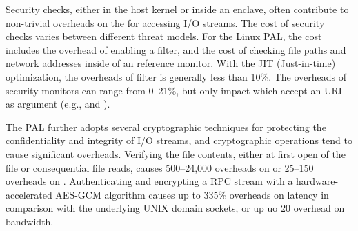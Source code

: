 Security checks, either in the host kernel or inside an enclave,
often contribute to
non-trivial overheads on the \hostapis{} for accessing I/O streams.
The cost of security checks
varies between different threat models.
For the Linux PAL, the cost includes the overhead of enabling a \seccomp{} filter, and the cost of checking file paths and network addresses
inside of an reference monitor.
With the JIT (Just-in-time) optimization,
the overheads of \seccomp{} filter is generally less than 10\%.
The overheads of security monitors can range from 0--21\%, but only impact \hostapis{} which accept an URI as argument (e.g.,  and ).

 
The \sgx{} PAL further adopts several cryptographic techniques
for protecting the confidentiality and integrity of I/O streams, and cryptographic operations tend to cause significant overheads.
Verifying the file contents, either at first open of the file or consequential file reads,
causes 500--24,000\x{} overheads on 
or 25--150\x{} overheads on .
Authenticating and encrypting a RPC stream with a hardware-accelerated AES-GCM algorithm
causes up to 335\% overheads on latency in comparison with
the underlying UNIX domain sockets,
or up uo \roughly{}20 \x{} overhead on bandwidth.


